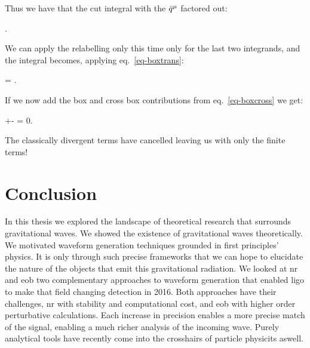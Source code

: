 \documentclass[
  10pt,
  a4paper,
  DIV=11,
  numbers=noendperiod,
  twoside]{scrreprt}
\let\[\relax \let\]\relax %
\DeclareRobustCommand{\[}{\begin{equation}}
\DeclareRobustCommand{\]}{\end{equation}}
\begin{document}
Thus we have that the cut integral with the \(\bar{q}_{}{}^{\mu}\) factored out:

\[
\int \dn[4]{\bar{\ell}}\Half{} .
\]

We can apply the relabelling only this time only for the last two
integrands, and the integral becomes, applying eq.~\ref{eq-boxtrans}:

\[
\int \dn[4]{\bar{\ell}}\Half{}= \int \dn[4]{\bar{\ell}}  .
\]

If we now add the box and cross box contributions from
eq.~\ref{eq-boxcross} we get:

\[
\int \dn[4]{\bar{\ell}}+-  =  0.
\]

The classically divergent terms have cancelled leaving us with only the
finite terms!


\hypertarget{sec-conclusion}{%
\chapter{Conclusion}\label{sec-conclusion}}

In this thesis we explored the landscape of theoretical research that
surrounds gravitational waves. We showed the existence of gravitational
waves theoretically. We motivated waveform generation techniques
grounded in first principles' physics. It is only through such precise
frameworks that we can hope to elucidate the nature of the objects that
emit this gravitational radiation. We looked at \gls{nr} and \gls{eob}
two complementary approaches to waveform generation that enabled
\gls{ligo} to make that field changing detection in 2016. Both
approaches have their challenges, \gls{nr} with stability and
computational cost, and \gls{eob} with higher order perturbative
calculations. Each increase in precision enables a more precise match of
the signal, enabling a much richer analysis of the incoming wave. Purely
analytical tools have recently come into the crosshairs of particle
physicits aswell.
\end{document}
